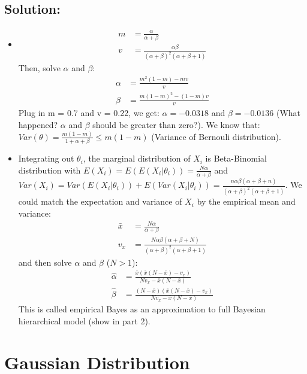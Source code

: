 \documentclass{harvardml}
\theoremstyle{definition}
\theoremstyle{plain}
\begin{document}
\subsection{Solution: }
\begin{itemize}
\item \begin{align*}
m & = \frac{\alpha}{\alpha + \beta} \\
v &= \frac{\alpha\beta}{(\alpha + \beta)^2(\alpha + \beta + 1)}
\end{align*}
Then,  solve $\alpha$ and $\beta$:
\begin{align*}
\alpha & = \frac{m^2(1-m) - mv}{v} \\
\beta &= \frac{m(1-m)^2 - (1-m)v}{v}
\end{align*}
Plug in m = 0.7 and v = 0.22, we get: $\alpha = -0.0318$ and $\beta = -0.0136$ (What happened? $\alpha$ and $\beta$ should be greater than zero?). We know that:
$Var(\theta) = \frac{m(1-m)}{1 + \alpha + \beta} \leq m(1-m)$ (Variance of Bernouli distribution).
\item Integrating out $\theta_i$, the marginal distribution of $X_i$ is Beta-Binomial distribution with $E(X_i) = E(E(X_i|\theta_i)) = \frac{N\alpha}{\alpha + \beta}$ and $Var(X_i) = Var(E(X_i|\theta_i)) + E(Var(X_i|\theta_i)) = \frac{n\alpha\beta(\alpha + \beta + n)}{{(\alpha + \beta)^2(\alpha + \beta + 1)}}$. We could match the expectation and variance of $X_i$ by the empirical mean and variance:
\begin{align*}
\bar x & = \frac{N\alpha}{\alpha + \beta} \\
v_x &= \frac{N\alpha\beta(\alpha + \beta + N)}{{(\alpha + \beta)^2(\alpha + \beta + 1)}}
\end{align*}
and then solve $\alpha$ and $\beta$ ($N>1$):
\begin{align*}
\hat\alpha & = \frac{\bar x(\bar x(N- \bar x) - v_x)}{Nv_x - \bar x(N- \bar x)} \\
\hat\beta &= \frac{(N-\bar x)(\bar x(N- \bar x) - v_x)}{Nv_x - \bar x(N- \bar x)}
\end{align*}
This is called empirical Bayes as an approximation to full Bayesian hierarchical model (show in part 2).
\end{itemize}


\section{Gaussian Distribution}
\end{document}
